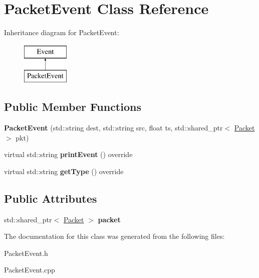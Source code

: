 \hypertarget{classPacketEvent}{\section{\-Packet\-Event \-Class \-Reference}
\label{classPacketEvent}
}
\-Inheritance diagram for \-Packet\-Event\-:\begin{figure}[H]
\begin{center}
\leavevmode
\includegraphics[height=2.000000cm]{classPacketEvent}
\end{center}
\end{figure}
\subsection*{\-Public \-Member \-Functions}
\begin{DoxyCompactItemize}
\item 
\hypertarget{classPacketEvent_a25509c37d21207e1150aa9032eca1a57}{{\bfseries \-Packet\-Event} (std\-::string dest, std\-::string src, float ts, std\-::shared\-\_\-ptr$<$ \hyperlink{classPacket}{\-Packet} $>$ pkt)}\label{classPacketEvent_a25509c37d21207e1150aa9032eca1a57}

\item 
\hypertarget{classPacketEvent_a71221422c26683393ef3a58784f526ff}{virtual std\-::string {\bfseries print\-Event} () override}\label{classPacketEvent_a71221422c26683393ef3a58784f526ff}

\item 
\hypertarget{classPacketEvent_a7dfa4c479200db12df64a12bc39d22d8}{virtual std\-::string {\bfseries get\-Type} () override}\label{classPacketEvent_a7dfa4c479200db12df64a12bc39d22d8}

\end{DoxyCompactItemize}
\subsection*{\-Public \-Attributes}
\begin{DoxyCompactItemize}
\item 
\hypertarget{classPacketEvent_ac3390dfb095c14e0b5c078b51dd914cf}{std\-::shared\-\_\-ptr$<$ \hyperlink{classPacket}{\-Packet} $>$ {\bfseries packet}}\label{classPacketEvent_ac3390dfb095c14e0b5c078b51dd914cf}

\end{DoxyCompactItemize}


\-The documentation for this class was generated from the following files\-:\begin{DoxyCompactItemize}
\item 
\-Packet\-Event.\-h\item 
\-Packet\-Event.\-cpp\end{DoxyCompactItemize}
